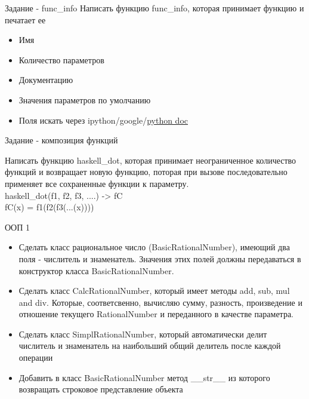 \documentclass{article}
\begin{document}
{\center Задание - func\_info}
    Написать функцию func\_info, которая принимает функцию и печатает ее
    \begin{itemize}
        \item Имя
        \item Количество параметров
        \item Документацию
        \item Значения параметров по умолчанию
        \item Поля искать через ipython/google/\href{http://docs.python.org/reference/datamodel.html}{python doc}
    \end{itemize}
\newpage
\begin{center}Задание - композиция функций\end{center}
    Написать функцию haskell\_dot, которая принимает неограниченное количество функций
    и возвращает новую функцию, поторая при вызове последовательно применяет все 
    сохраненные функции к параметру. \\

    haskell\_dot(f1, f2, f3, ....) -> fC \\
    fC(x) = f1(f2(f3(...(x))))
\newpage

\begin{center} ООП 1 \end{center}
\begin{itemize}
    \item Сделать класс рациональное число (BasicRationalNumber),
        имеющий два поля - числитель и знаменатель. Значения этих полей 
        должны передаваться в конструктор класса BasicRationalNumber.
    \item Сделать класс CalcRationalNumber, который имеет методы add,
        sub, mul and div. Которые, соответсвенно, вычисляю сумму, разность,
        произведение и отношение текущего RationalNumber и переданного в качестве 
        параметра.
    \item Сделать класс SimplRationalNumber, который автоматически делит
        числитель и знаменатель на наибольший общий делитель после каждой операции
    \item Добавить в класс BasicRationalNumber метод __str__ из которого возвращать
        строковое представление объекта
\end{itemize}
\end{document}
